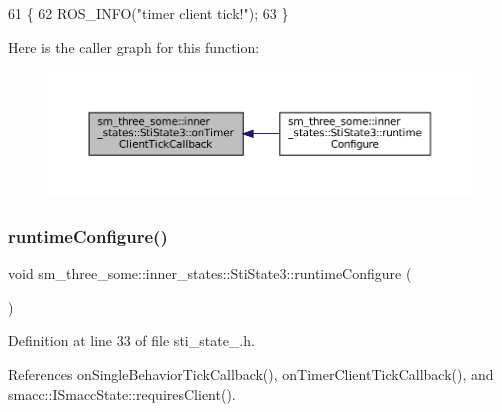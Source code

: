 \begin{DoxyCode}
61   \{
62     ROS\_INFO(\textcolor{stringliteral}{"timer client tick!"});
63   \}
\end{DoxyCode}
Here is the caller graph for this function\+:
\nopagebreak
\begin{figure}[H]
\begin{center}
\leavevmode
\includegraphics[width=350pt]{structsm__three__some_1_1inner__states_1_1StiState3_aa9e626e093269683522ed582db1c6bd6_icgraph}
\end{center}
\end{figure}
\mbox{\label{structsm__three__some_1_1inner__states_1_1StiState3_aec16c13bf440af18f898274110e97786}} 
\subsubsection{\texorpdfstring{runtime\+Configure()}{runtimeConfigure()}}
{\footnotesize\ttfamily void sm\+\_\+three\+\_\+some\+::inner\+\_\+states\+::\+Sti\+State3\+::runtime\+Configure (\begin{DoxyParamCaption}{ }\end{DoxyParamCaption})\hspace{0.3cm}{\ttfamily [inline]}}



Definition at line 33 of file sti\+\_\+state\+\_.\+h.



References on\+Single\+Behavior\+Tick\+Callback(), on\+Timer\+Client\+Tick\+Callback(), and smacc\+::\+I\+Smacc\+State\+::requires\+Client().


